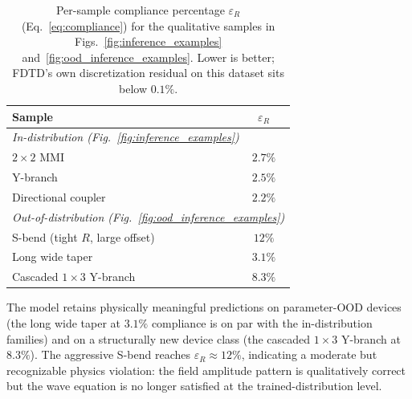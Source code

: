 \documentclass[%
 reprint,
 amsmath,amssymb,
 aps,
floatfix,
]{revtex4-2}
\begin{document}
\begin{table}[!htbp]
\centering
\caption{Per-sample compliance percentage $\varepsilon_R$ (Eq.~\eqref{eq:compliance}) for the qualitative samples in Figs.~\ref{fig:inference_examples} and~\ref{fig:ood_inference_examples}. Lower is better; FDTD's own discretization residual on this dataset sits below $0.1\%$.}
\label{tab:compliance}
\begin{ruledtabular}
\begin{tabular}{lc}
Sample & $\varepsilon_R$ \\
\hline
\multicolumn{2}{l}{\textit{In-distribution (Fig.~\ref{fig:inference_examples})}}\\
$2\times2$ MMI                  & $2.7\%$ \\
Y-branch                        & $2.5\%$ \\
Directional coupler             & $2.2\%$ \\[2pt]
\multicolumn{2}{l}{\textit{Out-of-distribution (Fig.~\ref{fig:ood_inference_examples})}}\\
S-bend (tight $R$, large offset) & $12\%$ \\
Long wide taper                  & $3.1\%$ \\
Cascaded $1\times3$ Y-branch     & $8.3\%$ \\
\end{tabular}
\end{ruledtabular}
\end{table}

The model retains physically meaningful predictions on parameter-OOD devices (the long wide taper at $3.1\%$ compliance is on par with the in-distribution families) and on a structurally new device class (the cascaded $1\times3$ Y-branch at $8.3\%$). The aggressive S-bend reaches $\varepsilon_R \approx 12\%$, indicating a moderate but recognizable physics violation: the field amplitude pattern is qualitatively correct but the wave equation is no longer satisfied at the trained-distribution level.


\clearpage


\end{document}
